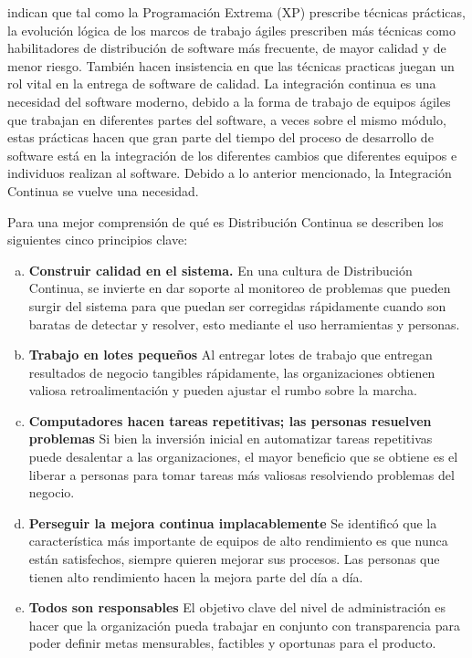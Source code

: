 \cite{humble2018accelerate} indican que tal como la Programación Extrema (XP) prescribe técnicas prácticas,
la evolución lógica de los marcos de trabajo ágiles prescriben más técnicas como habilitadores de
distribución de software más frecuente, de mayor calidad y de menor riesgo.
También hacen insistencia en que las técnicas practicas juegan un rol vital en la entrega de software de calidad.
La integración continua es una necesidad del software moderno, debido a la forma de trabajo de equipos
ágiles que trabajan en diferentes partes del software, a veces sobre el mismo módulo, estas prácticas
hacen que gran parte del tiempo del proceso de desarrollo de software está en la integración
de los diferentes cambios que diferentes equipos e individuos realizan al software.
Debido a lo anterior mencionado, la Integración Continua se vuelve una necesidad.

Para una mejor comprensión de qué es Distribución Continua se describen los siguientes cinco principios clave:

\vspace{-1em}
\begin{enumerate}[a.]
  \item \textbf{Construir calidad en el sistema.}
    En una cultura de Distribución Continua, se invierte en dar soporte al monitoreo de problemas
    que pueden surgir del sistema para que puedan ser corregidas rápidamente cuando son baratas de
    detectar y resolver, esto mediante el uso herramientas y personas.
  \item \textbf{Trabajo en lotes pequeños}
    Al entregar lotes de trabajo que entregan resultados de negocio tangibles rápidamente,
    las organizaciones obtienen valiosa retroalimentación y pueden ajustar el rumbo sobre la
    marcha.
  \item \textbf{Computadores hacen tareas repetitivas; las personas resuelven problemas}
    Si bien la inversión inicial en automatizar tareas repetitivas puede desalentar a las organizaciones,
    el mayor beneficio que se obtiene es el liberar a personas para tomar tareas más valiosas resolviendo
    problemas del negocio.
  \item \textbf{Perseguir la mejora continua implacablemente}
    Se identificó que la característica más importante de equipos de alto rendimiento es que nunca
    están satisfechos, siempre quieren mejorar sus procesos.
    Las personas que tienen alto rendimiento hacen la mejora parte del día a día.
  \item \textbf{Todos son responsables}
    El objetivo clave del nivel de administración es hacer que la organización pueda trabajar en conjunto
    con transparencia para poder definir metas mensurables, factibles y oportunas para el producto.
\end{enumerate}
\vspace{-1em}

